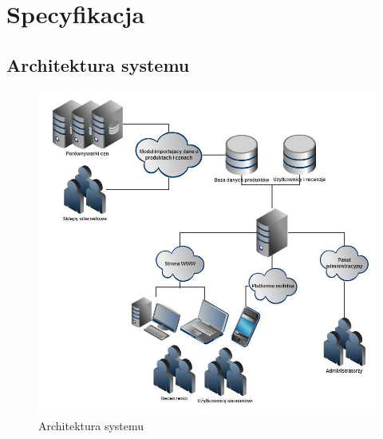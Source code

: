 \chapter{Specyfikacja}

\section{Architektura systemu}
\begin{figure}[h!]
	\centering
	\includegraphics[scale=0.5]{images/architektura.jpg}
	\caption{Architektura systemu}
\end{figure}

